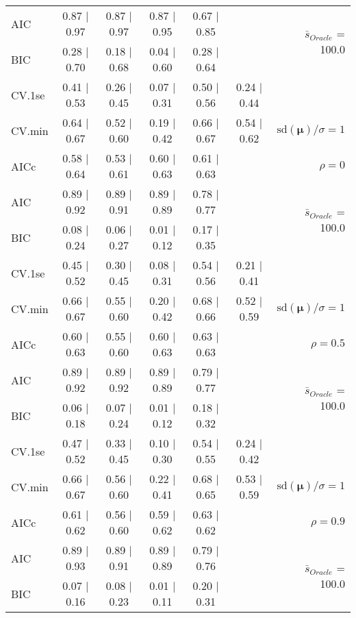 \begin{table}
\begin{center}
\begin{tabular}{l*{5}{c}|r}
AIC & 0.87 $\mid$ 0.97 & 0.87 $\mid$ 0.97 & 0.87 $\mid$ 0.95 & 0.67 $\mid$ 0.85 & &  \multirow{2}{*}{$\bar{s}_{Oracle}$ = 100.0} \\
BIC & 0.28 $\mid$ 0.70 & 0.18 $\mid$ 0.68 & 0.04 $\mid$ 0.60 & 0.28 $\mid$ 0.64 & &  \\
 \hline 
CV.1se & 0.41 $\mid$ 0.53 & 0.26 $\mid$ 0.45 & 0.07 $\mid$ 0.31 & 0.50 $\mid$ 0.56 & 0.24 $\mid$ 0.44 & \\
CV.min & 0.64 $\mid$ 0.67 & 0.52 $\mid$ 0.60 & 0.19 $\mid$ 0.42 & 0.66 $\mid$ 0.67 & 0.54 $\mid$ 0.62 &  $\mathrm{sd}(\mathbf{\mu})/\sigma=1$ \\
AICc & 0.58 $\mid$ 0.64 & 0.53 $\mid$ 0.61 & 0.60 $\mid$ 0.63 & 0.61 $\mid$ 0.63 & & $\rho=0$ \\
AIC & 0.89 $\mid$ 0.92 & 0.89 $\mid$ 0.91 & 0.89 $\mid$ 0.89 & 0.78 $\mid$ 0.77 & &  \multirow{2}{*}{$\bar{s}_{Oracle}$ = 100.0} \\
BIC & 0.08 $\mid$ 0.24 & 0.06 $\mid$ 0.27 & 0.01 $\mid$ 0.12 & 0.17 $\mid$ 0.35 & &  \\
 \hline 
CV.1se & 0.45 $\mid$ 0.52 & 0.30 $\mid$ 0.45 & 0.08 $\mid$ 0.31 & 0.54 $\mid$ 0.56 & 0.21 $\mid$ 0.41 & \\
CV.min & 0.66 $\mid$ 0.67 & 0.55 $\mid$ 0.60 & 0.20 $\mid$ 0.42 & 0.68 $\mid$ 0.66 & 0.52 $\mid$ 0.59 &  $\mathrm{sd}(\mathbf{\mu})/\sigma=1$ \\
AICc & 0.60 $\mid$ 0.63 & 0.55 $\mid$ 0.60 & 0.60 $\mid$ 0.63 & 0.63 $\mid$ 0.63 & & $\rho=0.5$ \\
AIC & 0.89 $\mid$ 0.92 & 0.89 $\mid$ 0.92 & 0.89 $\mid$ 0.89 & 0.79 $\mid$ 0.77 & &  \multirow{2}{*}{$\bar{s}_{Oracle}$ = 100.0} \\
BIC & 0.06 $\mid$ 0.18 & 0.07 $\mid$ 0.24 & 0.01 $\mid$ 0.12 & 0.18 $\mid$ 0.32 & &  \\
 \hline 
CV.1se & 0.47 $\mid$ 0.52 & 0.33 $\mid$ 0.45 & 0.10 $\mid$ 0.30 & 0.54 $\mid$ 0.55 & 0.24 $\mid$ 0.42 & \\
CV.min & 0.66 $\mid$ 0.67 & 0.56 $\mid$ 0.60 & 0.22 $\mid$ 0.41 & 0.68 $\mid$ 0.65 & 0.53 $\mid$ 0.59 &  $\mathrm{sd}(\mathbf{\mu})/\sigma=1$ \\
AICc & 0.61 $\mid$ 0.62 & 0.56 $\mid$ 0.60 & 0.59 $\mid$ 0.62 & 0.63 $\mid$ 0.62 & & $\rho=0.9$ \\
AIC & 0.89 $\mid$ 0.93 & 0.89 $\mid$ 0.91 & 0.89 $\mid$ 0.89 & 0.79 $\mid$ 0.76 & &  \multirow{2}{*}{$\bar{s}_{Oracle}$ = 100.0} \\
BIC & 0.07 $\mid$ 0.16 & 0.08 $\mid$ 0.23 & 0.01 $\mid$ 0.11 & 0.20 $\mid$ 0.31 & &  \\

\end{tabular}
\end{center}
\end{table}
